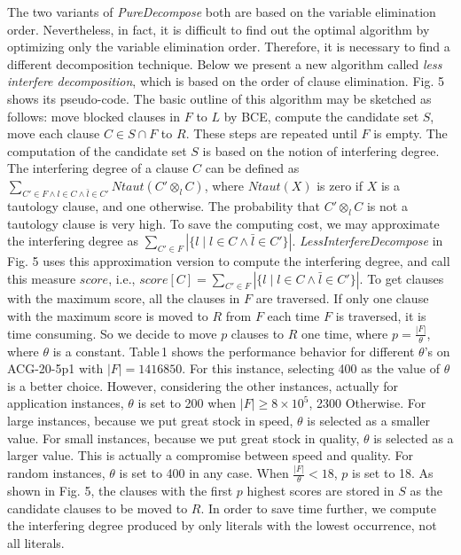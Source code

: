 \documentclass{llncs}
\begin{document}
The two variants of \emph{PureDecompose} both are based on the
variable elimination order. Nevertheless, in fact, it is difficult
to find out the optimal algorithm by optimizing only the variable
elimination order. Therefore, it is necessary to find a different
decomposition technique. Below we present a new algorithm called
\emph{less interfere decomposition}, which is based on the order of
clause elimination. Fig. 5 shows its pseudo-code. The basic outline
of this algorithm may be sketched as follows: move blocked clauses
in $F$ to $L$ by BCE, compute the candidate set $S$, move each
clause $C \in S \cap F$ to $R$. These steps are repeated until $F$
is empty. The computation of the candidate set $S$ is based on the
notion of interfering degree. The interfering degree of a clause $C$
can be defined as $\sum\limits_{C' \in F \wedge l \in C \wedge
\bar{l} \in C'} Ntaut(C' {\otimes}_l C) $, where $Ntaut(X)$ is zero
if $X$ is a tautology clause, and one otherwise. The probability
that $C' {\otimes}_l C$ is not a tautology clause is very high. To
save the computing cost, we may approximate the interfering degree
as $\sum\limits_{C' \in F} |\{l \mid l \in C \wedge \bar{l} \in
C'\}|$. \emph{LessInterfereDecompose} in Fig. 5 uses this
approximation version to compute the interfering degree, and call
this measure $score$, i.e., $score[C]= \sum\limits_{C' \in F} |\{l
\mid l \in C \wedge \bar{l} \in C'\}|$. To get clauses with the
maximum score, all the clauses in $F$ are traversed. If only one
clause with the maximum score is moved to $R$ from $F$ each time $F$
is traversed, it is time consuming. So we decide to move $p$ clauses
to $R$ one time, where $p=\frac{|F|}{\theta}$, where $\theta$ is a
constant. Table\,1 shows the performance behavior for different
$\theta$'s on ACG-20-5p1 with $|F|=1416850$. For this instance,
selecting 400 as the value of $\theta$ is a better choice. However,
considering the other instances, actually for application instances,
$\theta$ is set to 200 when $|F| \geq 8\times10^5$, 2300 Otherwise.
For large instances, because we put great stock in speed, $\theta$
is selected as a smaller value. For small instances, because we put
great stock in quality, $\theta$ is selected as a larger value. This
is actually a compromise between speed and quality. For random
instances, $\theta$ is set to 400 in any case. When
$\frac{|F|}{\theta} < 18 $, $p$ is set to 18. As shown in Fig. 5,
the clauses with the first $p$ highest scores are stored in $S$ as
the candidate clauses to be moved to $R$. In order to save time
further, we compute the interfering degree produced by only literals
with the lowest occurrence, not all literals.
\end{document}
